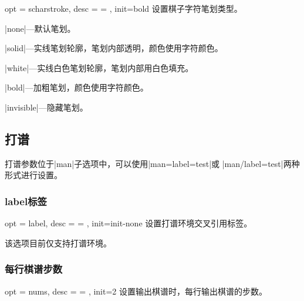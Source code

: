 \documentclass[full]{l3doc}
\begin{document}
\begin{documentation}
\begin{option}{ opt = scharstroke, desc = {= }, init=bold }
  设置棋子字符笔划类型。
\end{option}

  \begin{Description}[a]
    \item |none|---默认笔划。
    \item |solid|---实线笔划轮廓，笔划内部透明，颜色使用字符颜色。
    \item |white|---实线白色笔划轮廓，笔划内部用白色填充。
    \item |bold|---加粗笔划，颜色使用字符颜色。
    \item |invisible|---隐藏笔划。
  \end{Description}

\begin{SideBySideExample}[frame=single,numbers=left,
                xrightmargin=.58\linewidth,gobble=2]
  \centering
  \cchessboard[charstroke=white,
    redupper=red,blkupper=black]
\end{SideBySideExample}

\bigskip


\subsection{打谱}

打谱参数位于|man|子选项中，可以使用|man={label=test}|或
|man/label=test|两种形式进行设置。

\subsubsection{label标签}

\begin{option}{ opt = label, desc = {= }, init=init-none }
  设置打谱环境交叉引用标签。
\end{option}

  该选项目前仅支持打谱环境。

\subsubsection{每行棋谱步数}

\begin{option}{ opt = nums, desc = {= }, init=2 }
  设置输出棋谱时，每行输出棋谱的步数。
\end{option}


\end{documentation}
\end{document}
